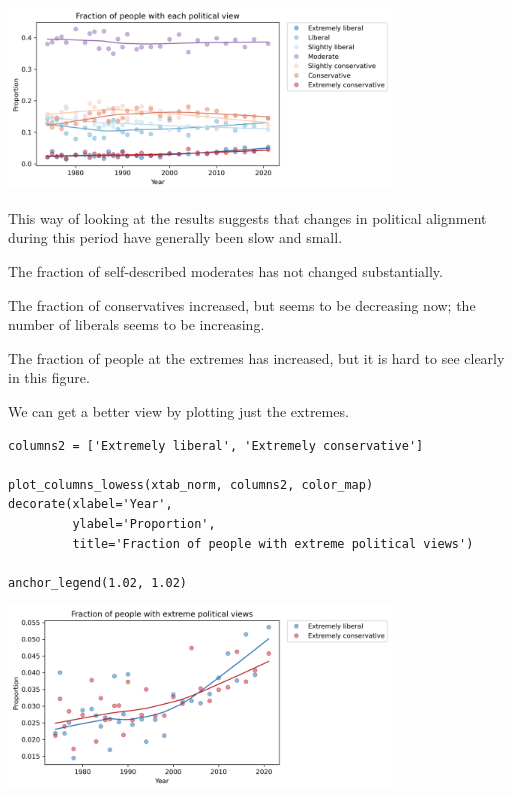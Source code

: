 \begin{center}
\includegraphics[width=4in]{chapters/02_polviews_files/02_polviews_87_0.png}
\end{center}

This way of looking at the results suggests that changes in political
alignment during this period have generally been slow and small.

The fraction of self-described moderates has not changed substantially.

The fraction of conservatives increased, but seems to be decreasing now;
the number of liberals seems to be increasing.

The fraction of people at the extremes has increased, but it is hard to
see clearly in this figure.

We can get a better view by plotting just the extremes.

\begin{lstlisting}[]
columns2 = ['Extremely liberal', 'Extremely conservative']

plot_columns_lowess(xtab_norm, columns2, color_map)
decorate(xlabel='Year',
         ylabel='Proportion',
         title='Fraction of people with extreme political views')

anchor_legend(1.02, 1.02)
\end{lstlisting}

\begin{center}
\includegraphics[width=4in]{chapters/02_polviews_files/02_polviews_89_0.png}
\end{center}

